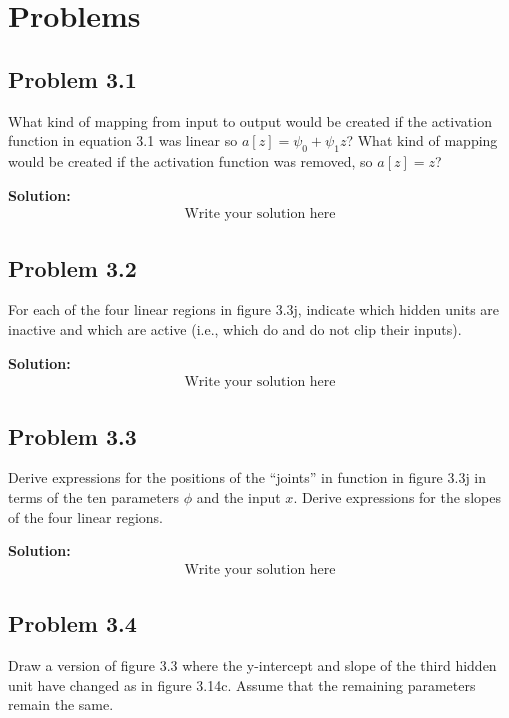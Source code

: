 \documentclass{article}
\begin{document}
\section*{Problems}

    \subsection*{Problem 3.1}
    What kind of mapping from input to output would be created if the activation function in equation 3.1 was linear so $a[z] = \psi_0 + \psi_1z$? What kind of mapping would be created if the activation function was removed, so $a[z] = z$?

        \vspace{1cm}
        \textbf{Solution:}
        \begin{align*}
            \text{Write your solution here}
        \end{align*}

    \subsection*{Problem 3.2}
    For each of the four linear regions in figure 3.3j, indicate which hidden units are inactive and which are active (i.e., which do and do not clip their inputs).

        \vspace{1cm}
        \textbf{Solution:}
        \begin{align*}
            \text{Write your solution here}
        \end{align*}

    \subsection*{Problem 3.3}
    Derive expressions for the positions of the “joints” in function in figure 3.3j in terms of the ten parameters $\phi$ and the input $x$. Derive expressions for the slopes of the four linear regions.

        \vspace{1cm}
        \textbf{Solution:}
        \begin{align*}
            \text{Write your solution here}
        \end{align*}

    \subsection*{Problem 3.4}
    Draw a version of figure 3.3 where the y-intercept and slope of the third hidden unit have changed as in figure 3.14c. Assume that the remaining parameters remain the same.
\end{document}
